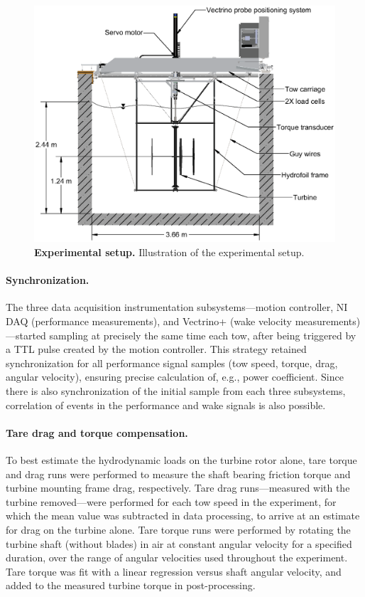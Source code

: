 \documentclass[10pt,letterpaper]{article}
\begin{document}
\begin{figure}[h]
    \centering

    \includegraphics[clip,trim=0.01in 0 0 0,
    width=\textwidth]{figures/tank_cross_section}

    \caption{{\bf Experimental setup.} Illustration of the experimental setup.}

    \label{fig:exp-setup}
\end{figure}

\paragraph{Synchronization.} The three data acquisition instrumentation
subsystems---motion controller, NI DAQ (performance measurements), and Vectrino+
(wake velocity measurements)---started sampling at precisely the same time each
tow, after being triggered by a TTL pulse created by the motion controller. This
strategy retained synchronization for all performance signal samples (tow speed,
torque, drag, angular velocity), ensuring precise calculation of, e.g., power
coefficient. Since there is also synchronization of the initial sample from each
three subsystems, correlation of events in the performance and wake signals is
also possible.

\paragraph{Tare drag and torque compensation.} To best estimate the hydrodynamic
loads on the turbine rotor alone, tare torque and drag runs were performed to
measure the shaft bearing friction torque and turbine mounting frame drag,
respectively. Tare drag runs---measured with the turbine removed---were
performed for each tow speed in the experiment, for which the mean value was
subtracted in data processing, to arrive at an estimate for drag on the turbine
alone. Tare torque runs were performed by rotating the turbine shaft (without
blades) in air at constant angular velocity for a specified duration, over the
range of angular velocities used throughout the experiment. Tare torque was fit
with a linear regression versus shaft angular velocity, and added to the
measured turbine torque in post-processing.
\end{document}
